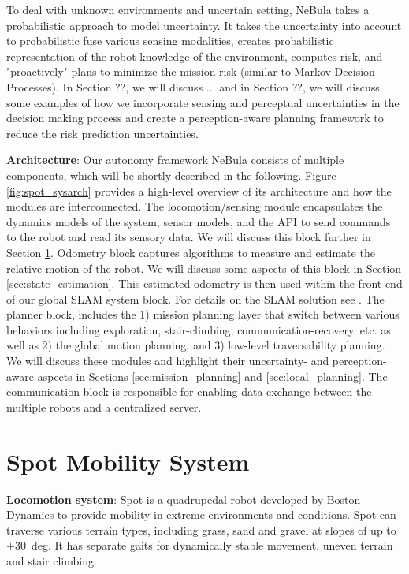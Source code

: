 \documentclass[a4paper, 10pt, conference]{ieeeconf}      %
\newcommand{\ph}[1]{{\textbf{#1}:}} %
\newcommand{\todo}[1]{{\color{red} #1 }} %
\begin{document}
To deal with unknown environments and uncertain setting, NeBula takes a probabilistic approach to model uncertainty. It takes the uncertainty into account to probabilistic fuse various sensing modalities, creates probabilistic representation of the robot knowledge of the environment, computes risk, and "proactively" plans to minimize the mission risk (similar to Markov Decision Processes). In Section ??, we will discuss ... and in Section ??, we will discuss some examples of how we incorporate sensing and perceptual uncertainties in the decision making process and create a perception-aware planning framework to reduce the risk prediction uncertainties.


\ph{Architecture} Our autonomy framework NeBula consists of multiple components, which will be shortly described in the following.
Figure \ref{fig:spot_sysarch} provides a high-level overview of its architecture and how the modules are interconnected. The locomotion/sensing module encapsulates the dynamics models of the system, sensor models, and the API to send commands to the robot and read its sensory data. We will discuss this block further in Section \ref{sec:spot}. Odometry block captures algorithms to measure and estimate the relative motion of the robot. We will discuss some aspects of this block in Section \ref{sec:state_estimation}. This estimated odometry is then used within the front-end of our global SLAM system block. For details on the SLAM solution see \cite{Ebadi2020}. The planner block, includes the 1) mission planning layer that switch between various behaviors including exploration, stair-climbing, communication-recovery, etc. as well as 2) the global motion planning, and 3) low-level traversability planning. We will discuss these modules and highlight their uncertainty- and perception-aware aspects in Sections \ref{sec:mission_planning} and \ref{sec:local_planning}. The communication block is responsible for enabling data exchange between the multiple robots and a centralized server.


\section{Spot Mobility System}\label{sec:spot}
\ph{Locomotion system} 
Spot is a quadrupedal robot developed by Boston Dynamics to provide mobility in extreme environments and conditions. Spot can traverse various terrain types, including grass, sand and gravel at slopes of up to $\pm$30~deg. %
It has separate gaits for dynamically stable movement, uneven terrain and stair climbing. %
\end{document}
